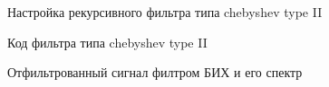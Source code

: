 \documentclass[12pt,a4paper]{scrartcl}
\begin{document}
\begin{figure}[h!]
\caption{Настройка рекурсивного фильтра типа chebyshev type II}
\end{figure}
\newpage


\begin{figure}[h!]
\caption{Код фильтра типа chebyshev type II}
\end{figure}

\begin{figure}[h!]
\caption{Отфильтрованный сигнал филтром БИХ и его спектр}
\end{figure}
\end{document}
